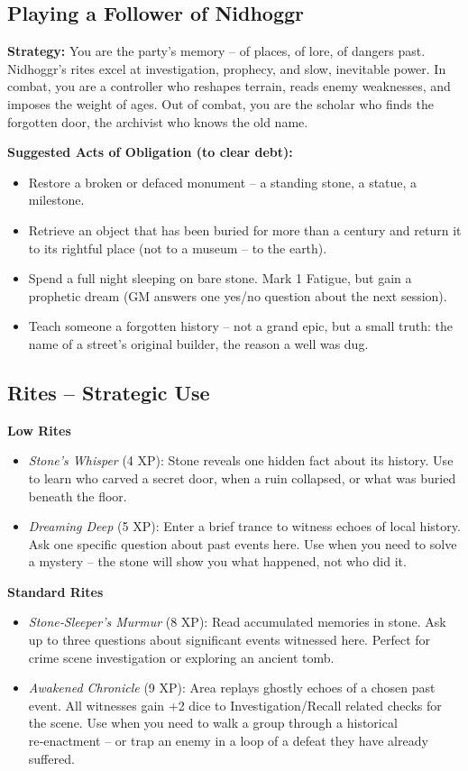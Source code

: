 \documentclass[10pt,a5paper]{book}
\begin{document}
\subsection*{Playing a Follower of Nidhoggr}

\textbf{Strategy:} You are the party’s memory – of places, of lore, of dangers past. Nidhoggr’s rites excel at investigation, prophecy, and slow, inevitable power. In combat, you are a controller who reshapes terrain, reads enemy weaknesses, and imposes the weight of ages. Out of combat, you are the scholar who finds the forgotten door, the archivist who knows the old name.

\textbf{Suggested Acts of Obligation (to clear debt):}
\begin{itemize}
    \item Restore a broken or defaced monument – a standing stone, a statue, a milestone.
    \item Retrieve an object that has been buried for more than a century and return it to its rightful place (not to a museum – to the earth).
    \item Spend a full night sleeping on bare stone. Mark 1 Fatigue, but gain a prophetic dream (GM answers one yes/no question about the next session).
    \item Teach someone a forgotten history – not a grand epic, but a small truth: the name of a street’s original builder, the reason a well was dug.
\end{itemize}

\subsection*{Rites – Strategic Use}

\textbf{Low Rites}
\begin{itemize}
    \item \textit{Stone’s Whisper} (4 XP): Stone reveals one hidden fact about its history. Use to learn who carved a secret door, when a ruin collapsed, or what was buried beneath the floor.
    \item \textit{Dreaming Deep} (5 XP): Enter a brief trance to witness echoes of local history. Ask one specific question about past events here. Use when you need to solve a mystery – the stone will show you what happened, not who did it.
\end{itemize}

\textbf{Standard Rites}
\begin{itemize}
    \item \textit{Stone‑Sleeper’s Murmur} (8 XP): Read accumulated memories in stone. Ask up to three questions about significant events witnessed here. Perfect for crime scene investigation or exploring an ancient tomb.
    \item \textit{Awakened Chronicle} (9 XP): Area replays ghostly echoes of a chosen past event. All witnesses gain +2 dice to Investigation/Recall related checks for the scene. Use when you need to walk a group through a historical re‑enactment – or trap an enemy in a loop of a defeat they have already suffered.
\end{itemize}
\end{document}
